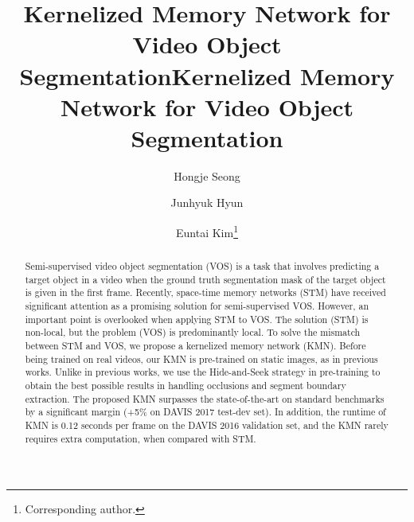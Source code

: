 \title{Kernelized Memory Network for Video Object Segmentation}



\pagestyle{headings}
\mainmatter
\def\ECCVSubNumber{4152}  %

\title{Kernelized Memory Network for Video Object Segmentation} %

\begin{comment}
\titlerunning{ECCV-20 submission ID \ECCVSubNumber} 
\authorrunning{ECCV-20 submission ID \ECCVSubNumber} 
\author{Anonymous ECCV submission}
\institute{Paper ID \ECCVSubNumber}
\end{comment}

\author{Hongje Seong \and %
Junhyuk Hyun \and
Euntai Kim\thanks{Corresponding author.}} %
\maketitle

\begin{abstract}
Semi-supervised video object segmentation (VOS) is a task that involves predicting a target object in a video when the ground truth segmentation mask of the target object is given in the first frame. Recently, space-time memory networks (STM) have received significant attention as a promising solution for semi-supervised VOS. However, an important point is overlooked when applying STM to VOS. The solution (STM) is non-local, but the problem (VOS) is predominantly local. To solve the mismatch between STM and VOS, we propose a kernelized memory network (KMN). Before being trained on real videos, our KMN is pre-trained on static images, as in previous works. Unlike in previous works, we use the Hide-and-Seek strategy in pre-training to obtain the best possible results in handling occlusions and segment boundary extraction.
The proposed KMN surpasses the state-of-the-art on standard benchmarks by a significant margin (+5\% on DAVIS 2017 test-dev set).
In addition, the runtime of KMN is 0.12 seconds per frame on the DAVIS 2016 validation set, and the KMN rarely requires extra computation, when compared with STM.
\end{abstract}

